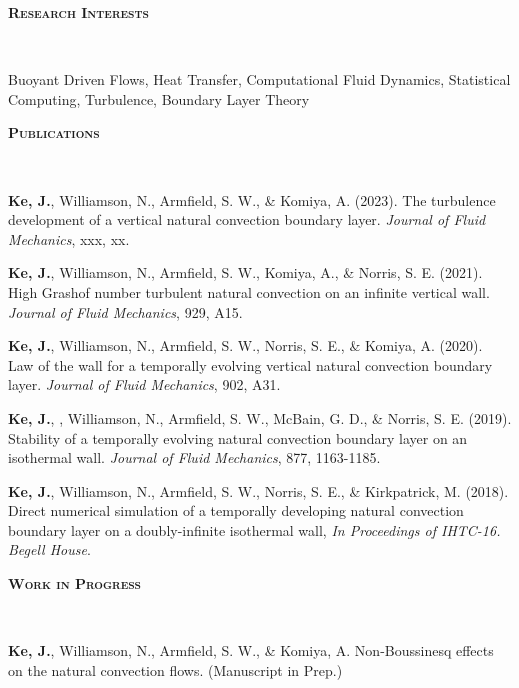 \documentclass[letterpaper, 10pt]{article}
\newenvironment{changemargin}[2]{%
  \begin{list}{}{%
      \setlength{\topsep}{0pt}%
      \setlength{\leftmargin}{#1}%
      \setlength{\rightmargin}{#2}%
      \setlength{\listparindent}{\parindent}%
      \setlength{\itemindent}{\parindent}%
      \setlength{\parsep}{\parskip}%
    }%
  \item[]}{\end{list}
}
\newcommand{\lineover}{
  \begin{changemargin}{-0.05in}{-0.05in}
    \vspace*{-8pt}
    \hrulefill \\
    \vspace*{-2pt}
  \end{changemargin}
}
\newcommand{\header}[1]{
  \begin{changemargin}{-0.5in}{-0.5in}
    \textbf{\scshape{#1}}\\
    \lineover
  \end{changemargin}
}
\newenvironment{body} {
  \vspace*{-16pt}
  \begin{changemargin}{-0.25in}{-0.5in}
  }
  {\end{changemargin}
}
\begin{document}
\header{Research Interests}
Buoyant Driven Flows, Heat Transfer, Computational Fluid Dynamics, Statistical Computing, Turbulence, Boundary Layer Theory
\smallskip



\header{Publications}
\begin{body}
  \vspace{14pt}
  
  \textbf{Ke, J.}, Williamson, N., Armfield, S. W., \& Komiya, A. (2023). The turbulence development of a vertical natural convection boundary layer. \emph{Journal of Fluid Mechanics}, xxx, xx.
  
  \smallskip
    
  \textbf{Ke, J.}, Williamson, N., Armfield, S. W., Komiya, A., \& Norris, S. E. (2021).  High Grashof number turbulent natural convection on an infinite vertical wall. \emph{Journal of Fluid Mechanics}, 929, A15.
  
  \smallskip
  
  \textbf{Ke, J.}, Williamson, N., Armfield, S. W., Norris, S. E., \& Komiya, A.  (2020). Law of the wall for a temporally evolving vertical natural convection boundary layer. \emph{Journal of Fluid Mechanics}, 902, A31.
  
  \smallskip

  \textbf{Ke, J.}, , Williamson, N., Armfield, S. W., McBain, G. D., \& Norris, S. E. (2019). Stability of a temporally evolving natural convection boundary layer on an isothermal wall. \emph{Journal of Fluid Mechanics}, 877, 1163-1185.

  \smallskip

  \textbf{Ke, J.}, Williamson, N., Armfield, S. W., Norris, S. E., \& Kirkpatrick, M. (2018). Direct numerical simulation of a temporally developing natural convection boundary layer on a doubly-infinite isothermal wall, \emph{In Proceedings of IHTC-16. Begell House}. %
  

\end{body}
\smallskip


\header{Work in Progress}
\begin{body}
  \vspace{14pt}

  \textbf{Ke, J.}, Williamson, N., Armfield, S. W., \& Komiya, A. Non-Boussinesq effects on the natural convection flows. (Manuscript in Prep.) %
\end{body}
\smallskip
\end{document}
